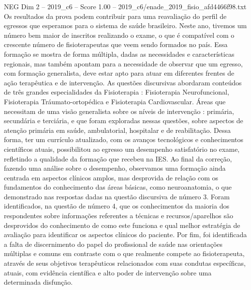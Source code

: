\begin{textsample}{NEG Dim 2 – 2019\_c6 – Score 1.00 – 2019\_c6/enade\_2019\_fisio\_afd4466f98.txt}
Os resultados da prova podem contribuir para uma reavaliação do perfil de egressos que esperamos para o sistema de saúde brasileiro.
Neste ano, tivemos um número bem maior de inscritos realizando o exame, o que é compatível com o crescente número de fisioterapeutas que veem sendo formados no país.
Essa formação se mostra de forma múltipla, dadas as necessidades e características regionais, mas também apontam para a necessidade de observar que um egresso, com formação generalista, deve estar apto para atuar em diferentes frentes de ação terapêutica e de intervenção.
As questões discursivas abordaram conteúdos de três grandes especialidades da Fisioterapia : Fisioterapia Neurofuncional, Fisioterapia Tráumato-ortopédica e Fisioterapia Cardiovascular.
Áreas que necessitam de uma visão generalista sobre os níveis de intervenção : primária, secundária e terciária, e que foram exploradas nessas questões, sobre aspectos de atenção primária em saúde, ambulatorial, hospitalar e de reabilitação.
Dessa forma, ter um currículo atualizado, com os avanços tecnológicos e conhecimentos científicos atuais, possibilitou ao egresso um desempenho satisfatório no exame, refletindo a qualidade da formação que recebeu na IES.
Ao final da correção, fazendo uma análise sobre o desempenho, observamos uma formação ainda centrada em aspectos clínicos amplos, mas desprovida de relação com os fundamentos do conhecimento das áreas básicas, como neuroanatomia, o que demonstrado nas respostas dadas na questão discursiva de número 3.
Foram identificados, na questão de número 4, que os conhecimentos da maioria dos respondentes sobre informações referentes a técnicas e recursos/aparelhos são desprovidos do conhecimento de como este funciona e qual melhor estratégia de avaliação para identificar os aspectos clínicos do paciente.
Por fim, foi identificada a falta de discernimento do papel do profissional de saúde nas orientações múltiplas e comuns em contraste com o que realmente compete ao fisioterapeuta, através de seus objetivos terapêuticos relacionados com suas condutas específicas, atuais, com evidência científica e alto poder de intervenção sobre uma determinada disfunção.

\end{textsample}
